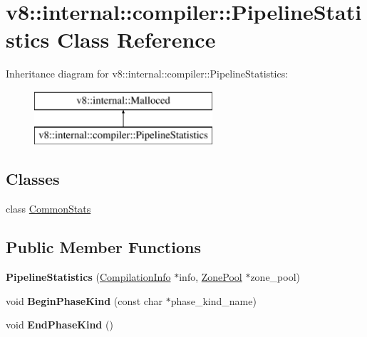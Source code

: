 \hypertarget{classv8_1_1internal_1_1compiler_1_1_pipeline_statistics}{}\section{v8\+:\+:internal\+:\+:compiler\+:\+:Pipeline\+Statistics Class Reference}
\label{classv8_1_1internal_1_1compiler_1_1_pipeline_statistics}
Inheritance diagram for v8\+:\+:internal\+:\+:compiler\+:\+:Pipeline\+Statistics\+:\begin{figure}[H]
\begin{center}
\leavevmode
\includegraphics[height=2.000000cm]{classv8_1_1internal_1_1compiler_1_1_pipeline_statistics}
\end{center}
\end{figure}
\subsection*{Classes}
\begin{DoxyCompactItemize}
\item 
class \hyperlink{classv8_1_1internal_1_1compiler_1_1_pipeline_statistics_1_1_common_stats}{Common\+Stats}
\end{DoxyCompactItemize}
\subsection*{Public Member Functions}
\begin{DoxyCompactItemize}
\item 
{\bfseries Pipeline\+Statistics} (\hyperlink{classv8_1_1internal_1_1_compilation_info}{Compilation\+Info} $\ast$info, \hyperlink{classv8_1_1internal_1_1compiler_1_1_zone_pool}{Zone\+Pool} $\ast$zone\+\_\+pool)\hypertarget{classv8_1_1internal_1_1compiler_1_1_pipeline_statistics_a64f4ef565bfb8a3d06a2e1616b0ad07a}{}\label{classv8_1_1internal_1_1compiler_1_1_pipeline_statistics_a64f4ef565bfb8a3d06a2e1616b0ad07a}

\item 
void {\bfseries Begin\+Phase\+Kind} (const char $\ast$phase\+\_\+kind\+\_\+name)\hypertarget{classv8_1_1internal_1_1compiler_1_1_pipeline_statistics_acd50ae95f638dfa5ea62dbea5e79eac0}{}\label{classv8_1_1internal_1_1compiler_1_1_pipeline_statistics_acd50ae95f638dfa5ea62dbea5e79eac0}

\item 
void {\bfseries End\+Phase\+Kind} ()\hypertarget{classv8_1_1internal_1_1compiler_1_1_pipeline_statistics_aa24205eb02f285ace465a6fbb0592b9d}{}\label{classv8_1_1internal_1_1compiler_1_1_pipeline_statistics_aa24205eb02f285ace465a6fbb0592b9d}

\end{DoxyCompactItemize}
